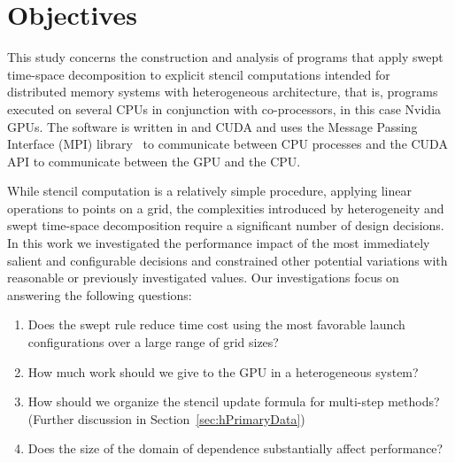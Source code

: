 \section{Objectives} \label{sec:obj1}

This study concerns the construction and analysis of programs that apply swept time-space decomposition to explicit stencil computations intended for distributed memory systems with heterogeneous architecture, that is, programs executed on several CPUs in conjunction with co-processors, in this case Nvidia GPUs.
The software is written in \CC{} and CUDA and uses the Message Passing Interface (MPI) library~\cite{Clarke1994} to communicate between CPU processes and the CUDA API to communicate between the GPU and the CPU.

While stencil computation is a relatively simple procedure, applying linear operations to points on a grid, the complexities introduced by heterogeneity and swept time-space decomposition require a significant number of design decisions.
In this work we investigated the performance impact of the most immediately salient and configurable decisions and constrained other potential variations with reasonable or previously investigated values.
Our investigations focus on answering the following questions:
\begin{enumerate}
    \item Does the swept rule reduce time cost using the most favorable launch configurations over a large range of grid sizes?
    \item How much work should we give to the GPU in a heterogeneous system?
    \item How should we organize the stencil update formula for multi-step methods? (Further discussion in Section~\ref{sec:hPrimaryData})
    \item Does the size of the domain of dependence substantially affect performance?
\end{enumerate}


